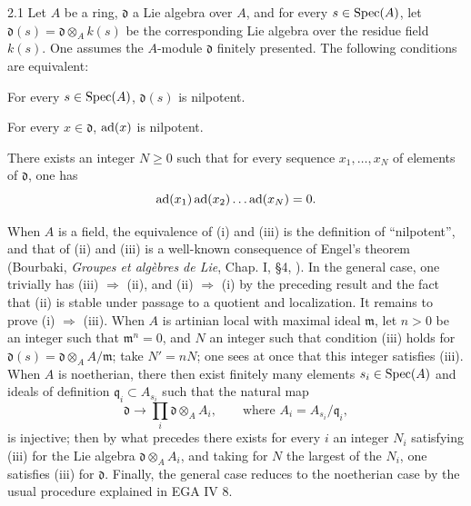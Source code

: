 \begin{lemma}{2.1}\label{XIV.2.1}
Let $A$ be a ring, $\mathfrak d$ a Lie algebra over $A$, and for every
$s\in\operatorname{Spec}(A)$, let $\mathfrak d(s)=\mathfrak d\otimes_A k(s)$ be the
corresponding Lie algebra over the residue field $k(s)$. One assumes
the $A$-module $\mathfrak d$ finitely presented. The following
conditions are equivalent:
\begin{enumeratei}
\item For every $s\in\operatorname{Spec}(A)$, $\mathfrak d(s)$ is nilpotent.
\item For every $x\in\mathfrak d$, $\operatorname{ad}(x)$ is nilpotent.
\item There exists an integer $N\geq0$ such that for every sequence
$x_1,\ldots,x_N$ of elements of $\mathfrak d$, one has
\[
 \operatorname{ad}(x_1)\operatorname{ad}(x_2)\ldots\operatorname{ad}(x_N)=0.
\]
\end{enumeratei}
\end{lemma}
When $A$ is a field, the equivalence of (i) and (iii) is the definition
of ``nilpotent'', and that of (ii) and (iii) is a well-known consequence
of Engel's theorem (Bourbaki, \emph{Groupes et alg\`ebres de Lie},
Chap. I, \S 4, ). In the general case, one trivially has
(iii) $\Rightarrow$ (ii), and (ii) $\Rightarrow$ (i) by the preceding
result and the fact that (ii) is stable under passage to a quotient
and localization. It remains to prove (i) $\Rightarrow$ (iii).
When $A$ is artinian local with maximal ideal $\mathfrak m$, let
$n>0$ be an integer such that $\mathfrak m^n=0$, and $N$ an integer
such that condition (iii) holds for $\mathfrak d(s)=
\mathfrak d\otimes_A A/\mathfrak m$; take $N'=nN$; one sees at once
that this integer satisfies (iii). When $A$ is noetherian, there
then exist finitely many elements $s_i\in\operatorname{Spec}(A)$ and ideals of
definition $\mathfrak q_i\subset A_{s_i}$ such that the natural map
\[
 \mathfrak d\longrightarrow\prod_i\mathfrak d\otimes_A A_i,
 \qquad\text{where }A_i=A_{s_i}/\mathfrak q_i,
\]
is injective; then by what precedes there exists for every $i$ an
integer $N_i$ satisfying (iii) for the Lie algebra
$\mathfrak d\otimes_A A_i$, and taking for $N$ the largest of the
$N_i$, one satisfies (iii) for $\mathfrak d$. Finally, the general
case reduces to the noetherian case by the usual procedure
explained in EGA IV 8.


